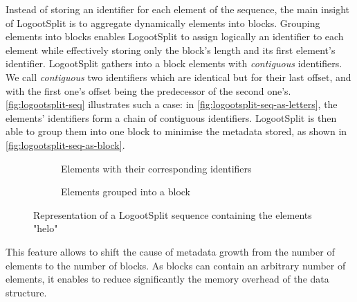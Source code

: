 \documentclass[sigplan,10pt]{acmart}
\newcommand{\trm}[1]{\mathit{#1}}
\newcommand{\id}[4]{$\trm{#1}^{\trm{#2}, \trm{#3}}_{\trm{#4}}$}
\newcommand{\widthletter}{6mm}
\begin{document}
Instead of storing an identifier for each element of the sequence, the main insight of LogootSplit is to aggregate dynamically elements into blocks.
Grouping elements into blocks enables LogootSplit to assign logically an identifier to each element while effectively storing only the block's length and its first element's identifier.
LogootSplit gathers into a block elements with \emph{contiguous} identifiers.
We call \emph{contiguous} two identifiers which are identical but for their last offset, and with the first one’s offset being the predecessor of the second one's.
\autoref{fig:logootsplit-seq} illustrates such a case: in \autoref{fig:logootsplit-seq-as-letters}, the elements' identifiers form a chain of contiguous identifiers.
LogootSplit is then able to group them into one block to minimise the metadata stored, as shown in \autoref{fig:logootsplit-seq-as-block}.

\begin{figure}
    \begin{subfigure}{0.45\columnwidth}
        \centering
        \caption{Elements with their corresponding identifiers}
        \label{fig:logootsplit-seq-as-letters}
    \end{subfigure}
    \begin{subfigure}{0.45\columnwidth}
        \centering
        \caption{Elements grouped into a block}
        \label{fig:logootsplit-seq-as-block}
    \end{subfigure}
    \caption{Representation of a LogootSplit sequence containing the elements "helo"}
    \label{fig:logootsplit-seq}
\end{figure}

This feature allows to shift the cause of metadata growth from the number of elements to the number of blocks.
As blocks can contain an arbitrary number of elements, it enables to reduce significantly the memory overhead of the data structure.
\end{document}
